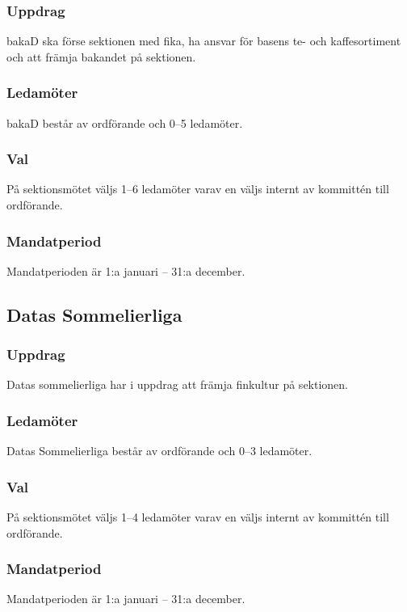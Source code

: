 \subsubsection{Uppdrag}
bakaD ska förse sektionen med fika, ha ansvar för basens te- och kaffesortiment och att främja bakandet på sektionen.
\subsubsection{Ledamöter}
bakaD består av ordförande och 0--5 ledamöter.
\subsubsection{Val}
På sektionsmötet väljs 1--6 ledamöter varav en väljs internt av kommittén till ordförande.
\subsubsection{Mandatperiod}
Mandatperioden är 1:a januari – 31:a december.

\subsection{Datas Sommelierliga}
\subsubsection{Uppdrag}
Datas sommelierliga har i uppdrag att främja finkultur på sektionen.
\subsubsection{Ledamöter}
Datas Sommelierliga består av ordförande och 0--3 ledamöter.
\subsubsection{Val}
På sektionsmötet väljs 1--4 ledamöter varav en väljs internt av kommittén till ordförande.
\subsubsection{Mandatperiod}
Mandatperioden är 1:a januari – 31:a december.
\newpage
